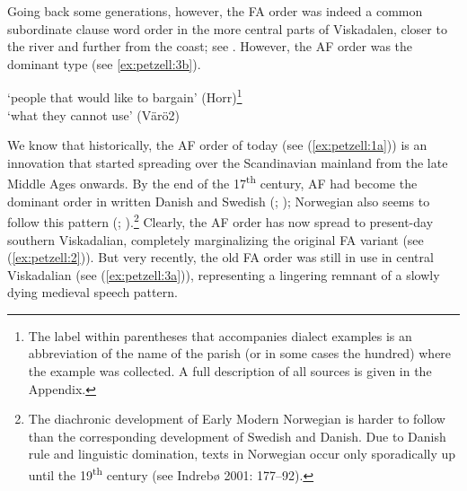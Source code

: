 \documentclass[output=paper,colorlinks,citecolor=brown,draft,draftmode]{langscibook}
\begin{document}
Going back some generations, however, the FA order was indeed a common subordinate clause word order in the more central parts of Viskadalen, closer to the river and further from the coast; see . However, the AF order was the dominant type (see \ref{ex:petzell:3b}).


\ea\label{ex:petzell:3}
\glt `people that would like to bargain’ (Horr)\footnote{The label within parentheses that accompanies dialect examples is an abbreviation of the name of the parish (or in some cases the hundred) where the example was collected. A full description of all sources is given in the Appendix.}  \\
\glt `what they cannot use’ (Värö2)
\z
\z


We know that historically, the AF order of today (see (\ref{ex:petzell:1a})) is an innovation that started spreading over the Scandinavian mainland from the late Middle Ages onwards. By the end of the 17\textsuperscript{th} century, AF had become the dominant order in written Danish \citep{Sundquist2003} and Swedish (\citealt{Falk1993}; \citealt{Hakansson2011}); Norwegian also seems to follow this pattern (\citealt{Christoffersen1997}; \citealt{Vitterso2004}).\footnote{The diachronic development of Early Modern Norwegian is harder to follow than the corresponding development of Swedish and Danish. Due to Danish rule and linguistic domination, texts in Norwegian occur only sporadically up until the 19\textsuperscript{th} century (see Indrebø 2001: 177–92).} Clearly, the AF order has now spread to present-day southern Viskadalian, completely marginalizing the original FA variant (see (\ref{ex:petzell:2})). But very recently, the old FA order was still in use in central Viskadalian (see (\ref{ex:petzell:3a})), representing a lingering remnant of a slowly dying medieval speech pattern.
\end{document}
